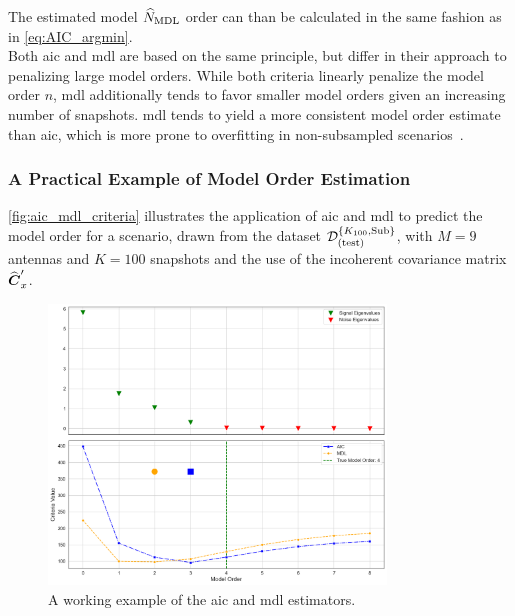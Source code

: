 The estimated model \( \widehat{N}_\mathrm{MDL} \) order can than be calculated in the same fashion as in \autoref{eq:AIC_argmin}.\\
Both \gls{aic} and \gls{mdl} are based on the same principle, but differ in their approach to penalizing large model orders.
While both criteria linearly penalize the model order \( n \), \gls{mdl} additionally tends to favor smaller model orders given
an increasing number of snapshots.
\gls{mdl} tends to yield a more consistent model order estimate than \gls{aic}, which is more prone to overfitting in non-subsampled
scenarios~\cite{mdlAndAic, barthelme2020}.\\


\subsubsection{A Practical Example of Model Order Estimation}
\autoref{fig:aic_mdl_criteria} illustrates the application of \gls{aic} and \gls{mdl} to predict the model order for
a scenario, drawn from the dataset \( \mathcal{D}^{\{K_{100},\text{Sub}\}}_{(\text{test})} \), with \( M = 9 \) antennas and \( K = 100 \) snapshots
and the use of the incoherent covariance matrix \( \widehat{\boldsymbol{C}}'_x \).

\begin{figure}[H]
    \centering
    \includegraphics[width=0.8\textwidth]{figures/04_ModelOrderEstimation/aic_mdl_criteria.png}
    \caption{A working example of the \gls{aic} and \gls{mdl} estimators.}
    \label{fig:aic_mdl_criteria}
\end{figure}

